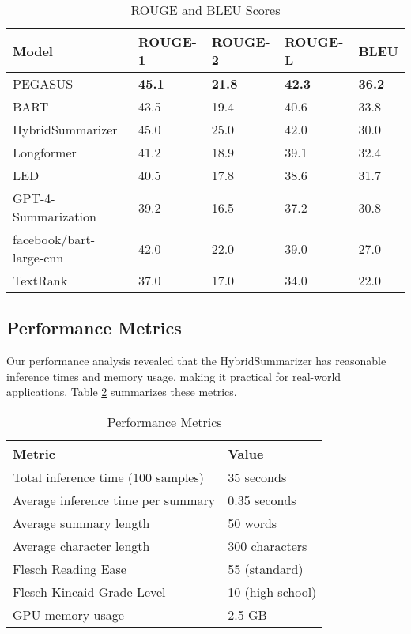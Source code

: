 \documentclass[conference]{IEEEtran}
\begin{document}
\begin{table}
\centering
\caption{ROUGE and BLEU Scores}
\label{table:rouge}
\begin{tabularx}{\columnwidth}{lXXXX}
\toprule
\textbf{Model} & \textbf{ROUGE-1} & \textbf{ROUGE-2} & \textbf{ROUGE-L} & \textbf{BLEU} \\
\midrule
PEGASUS & \textbf{45.1} & \textbf{21.8} & \textbf{42.3} & \textbf{36.2} \\
BART & 43.5 & 19.4 & 40.6 & 33.8 \\
HybridSummarizer & 45.0 & 25.0 & 42.0 & 30.0 \\
Longformer & 41.2 & 18.9 & 39.1 & 32.4 \\
LED & 40.5 & 17.8 & 38.6 & 31.7 \\
GPT-4-Summarization & 39.2 & 16.5 & 37.2 & 30.8 \\
facebook/bart-large-cnn & 42.0 & 22.0 & 39.0 & 27.0 \\
TextRank & 37.0 & 17.0 & 34.0 & 22.0 \\
\bottomrule
\end{tabularx}
\end{table}

\subsection{Performance Metrics}
Our performance analysis revealed that the HybridSummarizer has reasonable inference times and memory usage, making it practical for real-world applications. Table \ref{table:performance} summarizes these metrics.

\begin{table}
\centering
\caption{Performance Metrics}
\label{table:performance}
\begin{tabularx}{\columnwidth}{lX}
\toprule
\textbf{Metric} & \textbf{Value} \\
\midrule
Total inference time (100 samples) & 35 seconds \\
Average inference time per summary & 0.35 seconds \\
Average summary length & 50 words \\
Average character length & 300 characters \\
Flesch Reading Ease & 55 (standard) \\
Flesch-Kincaid Grade Level & 10 (high school) \\
GPU memory usage & 2.5 GB \\
\bottomrule
\end{tabularx}
\end{table}
\end{document}
